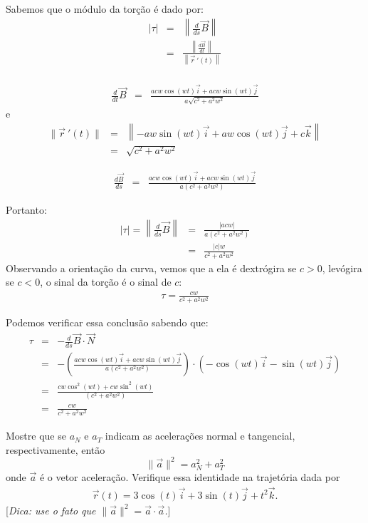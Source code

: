 \begin{resol}
Sabemos que o módulo da torção é dado por:
\begin{eqnarray*}
|\tau|&=&\left\|\frac{d}{ds}\vec{B}\right\|\\
&=& \frac{\left\|\frac{d\vec{B}}{dt} \right\|}{\left\|\vec{r}~\!'(t)\right\|}\\
\end{eqnarray*}

\begin{eqnarray*}
 \frac{d}{dt}\vec{B}
&=&\frac{acw\cos(wt)\vec{i}+acw\sin(wt)\vec{j}}{a\sqrt{c^2+a^2w^2}}
\end{eqnarray*}
e
\begin{eqnarray*}
\|\vec{r}~\!'(t)\|&=&\left\|-aw\sin(wt)\vec{i}+aw\cos(wt)\vec{j}+c\vec{k}\right\|\\
&=&\sqrt{c^2+a^2w^2}
\end{eqnarray*}


\begin{eqnarray*}
 \frac{d\vec{B}}{ds}
&=&\frac{acw\cos(wt)\vec{i}+acw\sin(wt)\vec{j}}{a(c^2+a^2w^2)}
\end{eqnarray*}

Portanto:
\begin{eqnarray*}
|\tau|=\left\|\frac{d}{ds}\vec{B}\right\|&=&
\frac{|acw|}{a(c^2+a^2w^2)}\\
&=&\frac{|c|w}{{c^2+a^2w^2}}
\end{eqnarray*}
Observando a orientação da curva, vemos que a ela é dextrógira se $c>0$, levógira se $c<0$, o sinal da torção é o sinal de $c$:
\begin{eqnarray*}
\tau=\frac{cw}{{c^2+a^2w^2}}
\end{eqnarray*}

Podemos verificar essa conclusão sabendo que:
\begin{eqnarray*}
\tau&=&-\frac{d}{ds}\vec{B}\cdot\vec{N}\\
&=&-\left(\frac{acw\cos(wt)\vec{i}+acw\sin(wt)\vec{j}}{a(c^2+a^2w^2)}\right)\cdot\left(-\cos(wt)\vec{i}-\sin(wt)\vec{j}\right)\\
&=&\frac{cw\cos^2(wt)+cw\sin^2(wt)}{(c^2+a^2w^2)}\\
&=&\frac{cw}{c^2+a^2w^2}
\end{eqnarray*}

\end{resol}

\begin{exeresol} Mostre que se $a_N$ e $a_T$ indicam as acelerações normal e tangencial, respectivamente, então
$$\|\vec{a}\|^2=a_N^2+a_T^2$$
onde $\vec{a}$ é o vetor aceleração. Verifique essa identidade na trajetória dada por
\begin{eqnarray*}
 \vec{r}(t)=3\cos (t) \vec{i} + 3\sin (t) \vec{j} +t^2\vec{k}.
\end{eqnarray*}
[{\it Dica: use o fato que $\|\vec{a}\|^2=\vec{a}\cdot\vec{a}$.}]
\end{exeresol}

